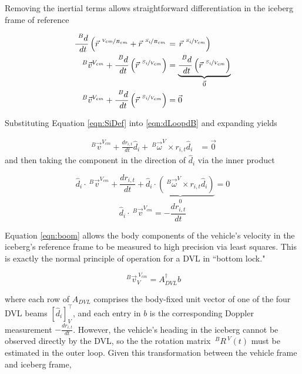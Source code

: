 Removing the inertial terms allows straightforward differentiation in the iceberg frame of reference


\begin{align} %
   \frac{~^Bd}{~dt}\left(\vec{r}^{~\nicefrac{V_{cm}}{B_{cm}}}+ \vec{r}^{~\nicefrac{S_i}{B_{cm}}}\right.& =\left. \vec{r}^{~\nicefrac{S_i}{V_{cm}}}\right)\\
   ~^B\vec{v}^{V_{cm}}  + \frac{~^Bd}{~dt}\left(\vec{r}^{~\nicefrac{S_{i}}{V_{cm}}}\right) &= \underbrace{\frac{~^Bd}{~dt}\left(\vec{r}^{~\nicefrac{S_i}{V_{cm}}}\right)}_{\vec{0}} \\
   ~^B\vec{v}^{V_{cm}}  + \frac{~^Bd}{~dt}\left(\vec{r}^{~\nicefrac{S_{i}}{V_{cm}}}\right) &= \vec{0}
   \label{eqn:dLoopdB}
\end{align}

Substituting Equation \ref{eqn:SiDef} into \ref{eqn:dLoopdB} and expanding yields

\begin{align} %
   ~^B\vec{v}^{V_{cm}}  + \frac{dr_{i,t}}{dt}\hat{d}_i + ~^B\vec{\omega}^V \times r_{i,t}\hat{d}_i&= \vec{0}
   \label{eqn:gettingClose}
\end{align}
and then taking the component  in the direction of $\hat{d}_i$ via the inner product

\begin{equation} %
   \hat{d}_i \cdot ~^B\vec{v}^{V_{cm}}  + \frac{dr_{i,t}}{dt} + \underbrace{ \hat{d}_i \cdot \left( ~^B\vec{\omega}^V \times r_{i,t}\hat{d}_i\right)}_{0} = 0
   \label{eqn:bodyVelocity}
   \end{equation}
   \begin{equation}
   \hat{d}_i \cdot ~^B\vec{v}^{V_{cm}} = - \frac{dr_{i,t}}{dt}
   \label{eqn:boom}
\end{equation}

Equation \ref{eqn:boom} allows the body components of the vehicle's velocity in the iceberg's reference frame to be measured to high precision via least squares. This is exactly the normal principle of operation for a DVL in ``bottom lock." 

   \begin{equation}
   ~^B\vec{v}^{~V_{cm}}_V = A_{DVL}^\dagger b
   \label{eqn:LSDVL}
\end{equation}

where each row of $A_{DVL}$ comprises the body-fixed unit vector of one of the four DVL beams $\left[\hat{d}_i\right]_V^\intercal$, and each entry in $b$ is the corresponding Doppler measurement $ -\frac{dr_{i,t}}{dt} $. However, the vehicle's heading in the iceberg cannot be observed directly by the DVL, so the the rotation matrix $~^BR^{~V}(t) $ must be estimated in the outer loop. Given this transformation between the vehicle frame and iceberg frame, 

